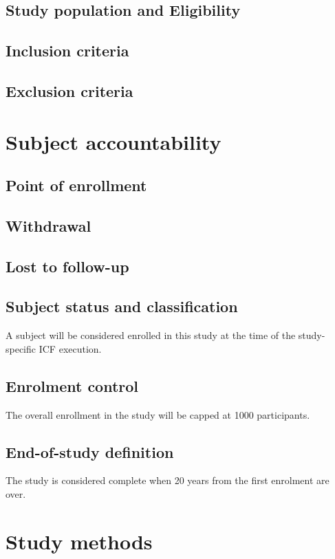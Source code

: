 \documentclass[
	a4paper, 
	11.5pt,
	headings=small, 
	twoside, 
	titlepage=firstiscover, 
 	pagesize=auto,
  	version=last,
	open=any,
	BCOR=12mm,
  	chapterprefix=false]{scrbook}
\begin{document}
\subsection{Study population and Eligibility}
\subsection{Inclusion criteria}
\subsection{Exclusion criteria}

\section{Subject accountability}

\subsection{Point of enrollment}

\subsection{Withdrawal}

\subsection{Lost to follow-up}

\subsection{Subject status and classification}
A subject will be considered enrolled in this study at the time of the study-specific \ac{ICF} execution.

\subsection{Enrolment control}
The overall enrollment in the study will be capped at 1000 participants.

\subsection{End-of-study definition}
The study is considered complete when 20 years from the first enrolment are over.

\section{Study methods}
\end{document}
